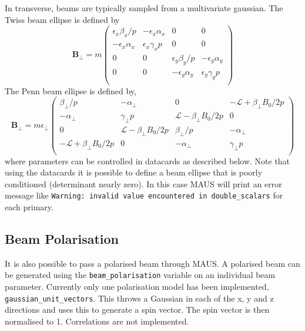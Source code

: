 In transverse, beams are typically sampled from a multivariate gaussian. The Twiss beam ellipse is defined by
\begin{equation}
\mathbf{B_\perp} = m \left(\begin{array}{cccc}
\epsilon_x \beta_x/p   & -\epsilon_x\alpha_x & 0 & 0 \\
-\epsilon_x\alpha_x & \epsilon_x\gamma_x p  & 0 & 0 \\
0 & 0  & \epsilon_y\beta_y/p  & -\epsilon_y\alpha_y \\
0 & 0 & -\epsilon_y\alpha_y & \epsilon_y\gamma_y p \\
\end{array}\right)
\end{equation}
The Penn beam ellipse is defined by,
\begin{equation}
\mathbf{B_\perp} = m\epsilon_\perp \left(\begin{array}{cccc}
\beta_\perp/p   & -\alpha_\perp & 0 & -\mathcal{L}+\beta_\perp B_0/2p \\
-\alpha_\perp & \gamma_\perp p  & \mathcal{L}-\beta_\perp B_0/2p & 0 \\
0 & \mathcal{L}-\beta_\perp B_0/2p  & \beta_\perp/p  & -\alpha_\perp \\
-\mathcal{L}+\beta_\perp B_0/2p & 0 & -\alpha_\perp & \gamma_\perp p \\
\end{array}\right)
\end{equation}
where parameters can be controlled in datacards as described below. Note that using the datacards it is possible to define a beam ellipse that is poorly conditioned (determinant nearly zero). In this case MAUS will print an error message like \verb|Warning: invalid value encountered in double_scalars| for each primary.

\subsection{Beam Polarisation}
It is also possible to pass a polarised beam through MAUS. A polarised beam can be generated using the \verb|beam_polarisation| variable on an individual beam parameter. Currently only one polarisation model has been implemented, \verb|gaussian_unit_vectors|. This throws a Gaussian in each of the x, y and z directions and uses this to generate a spin vector. The spin vector is then normalised to 1. Correlations are not implemented.


